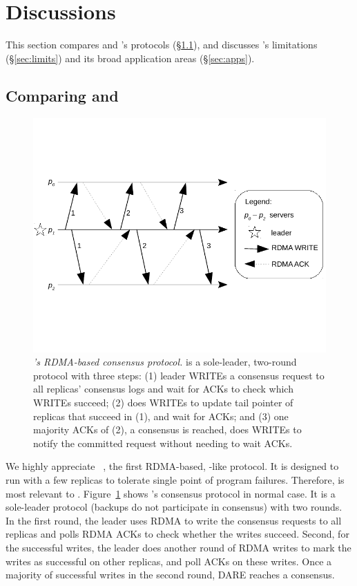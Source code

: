 \section{Discussions}\label{sec:discuss}
% 
This section compares \xxx and \dare's protocols (\S\ref{sec:compare}), and 
discusses \xxx's limitations (\S\ref{sec:limits}) and its broad application 
areas (\S\ref{sec:apps}).

\subsection{Comparing \xxx and \dare}\label{sec:compare}

\begin{figure}[t]
\centering
\vspace{-.5in}
\includegraphics[width=.35\textwidth]{figures/dare}
\vspace{-.6in}
\caption{{\em \dare's RDMA-based consensus protocol.} \dare is a sole-leader, 
two-round protocol with three steps: (1) leader WRITEs a consensus request to 
all replicas' consensus logs and wait for ACKs to check which WRITEs succeed; 
(2) \dare does WRITEs to update tail pointer of replicas that succeed in (1), 
and wait for ACKs; and (3) one majority ACKs of (2), a consensus is reached, 
\dare does WRITEs to notify the committed request without needing to wait 
ACKs.} 
\label{fig:dare}
\vspace{-.20in}
\end{figure}

We highly appreciate \dare~\cite{dare:hpdc15}, the first RDMA-based, 
\paxos-like protocol. It is designed to run with a few replicas to tolerate 
single point of program failures. Therefore, \dare is most relevant to \xxx. 
Figure~\ref{fig:dare} shows \dare's consensus protocol in normal case. It is a 
sole-leader protocol (backups do not participate in consensus) with two rounds. 
In the first round, the leader uses RDMA to write the consensus requests to all 
replicas and polls RDMA ACKs to check whether the writes succeed. Second, for 
the successful writes, the leader does another round of RDMA writes to mark the 
writes as successful on other replicas, and poll ACKs on these writes. Once a 
majority of successful writes in the second round, DARE reaches a consensus.

